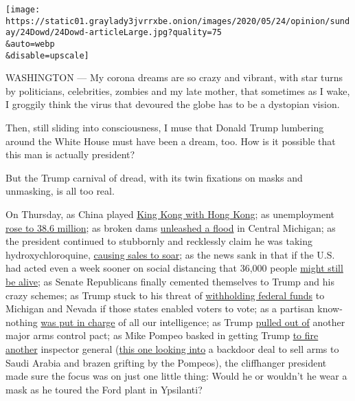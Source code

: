 \texttt{[image: https://static01.graylady3jvrrxbe.onion/images/2020/05/24/opinion/sunday/24Dowd/24Dowd-articleLarge.jpg?quality=75\\\&auto=webp\\\&disable=upscale]}

WASHINGTON --- My corona dreams are so crazy and vibrant, with star
turns by politicians, celebrities, zombies and my late mother, that
sometimes as I wake, I groggily think the virus that devoured the globe
has to be a dystopian vision.

Then, still sliding into consciousness, I muse that Donald Trump
lumbering around the White House must have been a dream, too. How is it
possible that this man is actually president?

But the Trump carnival of dread, with its twin fixations on masks and
unmasking, is all too real.

On Thursday, as China played
\href{https://www.nytimes3xbfgragh.onion/2020/05/22/world/asia/hong-kong-china-protest.html}{King
Kong with Hong Kong}; as unemployment
\href{https://www.nytimes3xbfgragh.onion/2020/05/21/us/coronavirus-news-tracker.html}{rose
to 38.6 million}; as broken dams
\href{https://www.nytimes3xbfgragh.onion/2020/05/20/us/michigan-dams.html}{unleashed
a flood} in Central Michigan; as the president continued to stubbornly
and recklessly claim he was taking hydroxychloroquine,
\href{https://www.cnn.com/2020/05/22/health/hydroxychloroquine-sales-covid-19-trump-invs/index.html}{causing
sales to soar}; as the news sank in that if the U.S. had acted even a
week sooner on social distancing that 36,000 people
\href{https://www.nytimes3xbfgragh.onion/2020/05/20/us/coronavirus-distancing-deaths.html}{might
still be alive}; as Senate Republicans finally cemented themselves to
Trump and his crazy schemes; as Trump stuck to his threat of
\href{https://www.nytimes3xbfgragh.onion/2020/05/20/us/politics/trump-michigan-vote-by-mail.html}{withholding
federal funds} to Michigan and Nevada if those states enabled voters to
vote; as a partisan know-nothing
\href{https://www.nytimes3xbfgragh.onion/2020/05/21/us/politics/john-ratcliffe-intelligence-director.html}{was
put in charge} of all our intelligence; as Trump
\href{https://www.nytimes3xbfgragh.onion/2020/05/21/us/politics/trump-open-skies-treaty-arms-control.html}{pulled
out of} another major arms control pact; as Mike Pompeo basked in
getting Trump
\href{https://www.nytimes3xbfgragh.onion/2020/05/22/us/politics/trump-inspectors-general.html}{to
fire another} inspector general
(\href{https://www.nytimes3xbfgragh.onion/2020/05/19/opinion/pompeo-state-department-inspector-general.html}{this
one looking into} a backdoor deal to sell arms to Saudi Arabia and
brazen grifting by the Pompeos), the cliffhanger president made sure the
focus was on just one little thing: Would he or wouldn't he wear a mask
as he toured the Ford plant in Ypsilanti?

